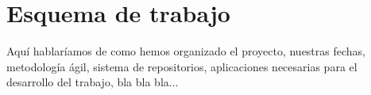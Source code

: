 \section{Esquema de trabajo}
\label{makereference1.5}
Aquí hablaríamos de como hemos organizado el proyecto, nuestras fechas, metodología ágil, sistema de repositorios, aplicaciones necesarias para el desarrollo del trabajo, bla bla bla...
